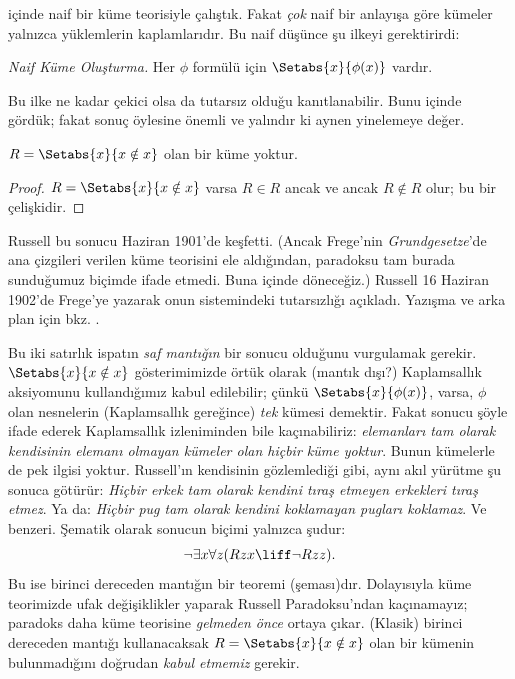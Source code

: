 \documentclass[../../../include/open-logic-section]{subfiles}
\begin{document}

 içinde naif bir küme teorisiyle çalıştık. Fakat
\emph{çok} naif bir anlayışa göre kümeler yalnızca yüklemlerin kaplamlarıdır.
Bu naif düşünce şu ilkeyi gerektirirdi:

\begin{defish}
  \emph{Naif Küme Oluşturma.} Her $\phi$ formülü için
  $\Setabs{x}{\phi(x)}$ vardır.
\end{defish}

Bu ilke ne kadar çekici olsa da tutarsız olduğu kanıtlanabilir. Bunu
 içinde gördük; fakat sonuç öylesine önemli ve
yalındır ki aynen yinelemeye değer.

\begin{thm}
$R=\Setabs{x}{x\notin x}$ olan bir küme yoktur.
\end{thm}

\begin{proof}
$R=\Setabs{x}{x\notin x}$ varsa $R\in R$ ancak ve ancak $R\notin R$ olur;
bu bir çelişkidir.
\end{proof}

Russell bu sonucu Haziran 1901'de keşfetti. (Ancak Frege'nin
\emph{Grundgesetze}'de ana çizgileri verilen küme teorisini ele aldığından,
paradoksu tam burada sunduğumuz biçimde ifade etmedi. Buna
 içinde döneceğiz.) Russell 16 Haziran 1902'de Frege'ye
yazarak onun sistemindeki tutarsızlığı açıkladı. Yazışma ve arka plan için
bkz. \citet[pp.~124--8]{Heijenoort1967}.

Bu iki satırlık ispatın \emph{saf mantığın} bir sonucu olduğunu vurgulamak
gerekir. $\Setabs{x}{x\notin x}$ gösterimimizde örtük olarak (mantık dışı?)
Kaplamsallık aksiyomunu kullandığımız kabul edilebilir; çünkü
$\Setabs{x}{\phi(x)}$, varsa, $\phi$ olan nesnelerin (Kaplamsallık gereğince)
\emph{tek} kümesi demektir. Fakat sonucu şöyle ifade ederek Kaplamsallık
izleniminden bile kaçınabiliriz: \emph{elemanları tam olarak kendisinin
elemanı olmayan kümeler olan hiçbir küme yoktur}. Bunun kümelerle de pek
ilgisi yoktur. Russell'ın kendisinin gözlemlediği gibi, aynı akıl yürütme şu
sonuca götürür: \emph{Hiçbir erkek tam olarak kendini tıraş etmeyen erkekleri
tıraş etmez}. Ya da: \emph{Hiçbir pug tam olarak kendini koklamayan pugları
koklamaz}. Ve benzeri. Şematik olarak sonucun biçimi yalnızca şudur:
\[
\lnot \exists x \forall z(Rzx \liff \lnot R zz).
\]
Bu ise birinci dereceden mantığın bir teoremi (şeması)dır. Dolayısıyla küme
teorimizde ufak değişiklikler yaparak Russell Paradoksu'ndan kaçınamayız;
paradoks daha küme teorisine \emph{gelmeden önce} ortaya çıkar. (Klasik)
birinci dereceden mantığı kullanacaksak $R=\Setabs{x}{x\notin x}$ olan bir
kümenin bulunmadığını doğrudan \emph{kabul etmemiz} gerekir.
\end{document}
